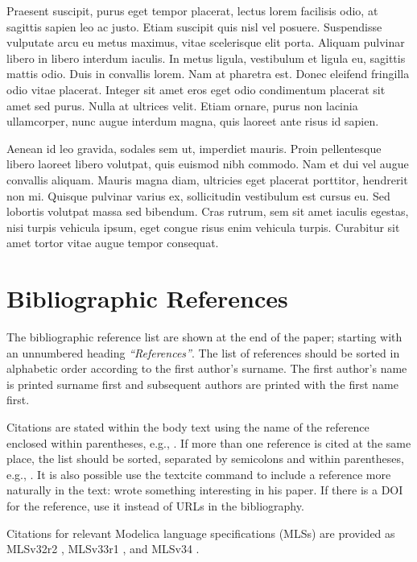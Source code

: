 \documentclass{modelica}
\begin{document}
Praesent suscipit, purus eget tempor placerat, lectus lorem facilisis odio, at sagittis sapien leo ac justo. Etiam suscipit quis nisl vel posuere. Suspendisse vulputate arcu eu metus maximus, vitae scelerisque elit porta. Aliquam pulvinar libero in libero interdum iaculis. In metus ligula, vestibulum et ligula eu, sagittis mattis odio. Duis in convallis lorem. Nam at pharetra est. Donec eleifend fringilla odio vitae placerat. Integer sit amet eros eget odio condimentum placerat sit amet sed purus. Nulla at ultrices velit. Etiam ornare, purus non lacinia ullamcorper, nunc augue interdum magna, quis laoreet ante risus id sapien.

Aenean id leo gravida, sodales sem ut, imperdiet mauris. Proin pellentesque libero laoreet libero volutpat, quis euismod nibh commodo. Nam et dui vel augue convallis aliquam. Mauris magna diam, ultricies eget placerat porttitor, hendrerit non mi. Quisque pulvinar varius ex, sollicitudin vestibulum est cursus eu. Sed lobortis volutpat massa sed bibendum. Cras rutrum, sem sit amet iaculis egestas, nisi turpis vehicula ipsum, eget congue risus enim vehicula turpis. Curabitur sit amet tortor vitae augue tempor consequat.

\section{Bibliographic References}
The bibliographic reference list are shown at the end of the paper;
starting with an unnumbered heading \emph{``References''}. The list of
references should be sorted in alphabetic order according to the first
author's surname.
The first author's name is printed surname first and subsequent authors are printed with the first name first.

Citations are stated within the body text using the name of the
reference enclosed within parentheses, e.g., \cite{Pantelides:1988}. If
more than one reference is cited at the same place, the list should be
sorted, separated by semicolons and within parentheses, e.g.,
\cite{DuffReid:1978,Pierce:2002,Plotkin:1981}.
It is also possible use the textcite command to include a reference more naturally in the text: \textcite{Pantelides:1988} wrote something interesting in his paper.
If there is a DOI for the reference, use it instead of URLs in the bibliography.

Citations for relevant Modelica language specifications (MLSs) are provided as
MLSv32r2 \cite{MLSv32r2}, MLSv33r1 \cite{MLSv33r1}, and MLSv34 \cite{MLSv34}.
\end{document}

